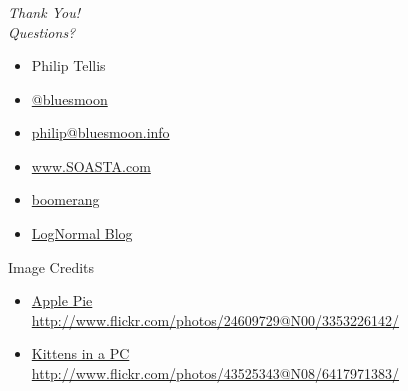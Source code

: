 \documentclass{beamer}
\newcommand{\innersplash}[1]{
  \begin{center}
    \Large \textrm{\textit{ #1 } }
  \end{center}
}
\newcommand{\splashslide}[2][{}]{
  \begin{frame}
  \frametitle{#1}
  \innersplash{#2}
  \end{frame}
}
\begin{document}
\splashslide{Thank You! \\ Questions?}

\begin{frame}
  \begin{itemize}
  \item Philip Tellis
  \item \href{http://twitter.com/bluesmoon}{@bluesmoon}
  \item \href{http://bluesmoon.info/}{philip@bluesmoon.info}
  \item \href{http://www.soasta.com/}{www.SOASTA.com}
  \item \href{http://lognormal.github.com/boomerang/doc/}{boomerang}
  \item \href{http://www.lognormal.com/blog/}{LogNormal Blog}
  \end{itemize}
\end{frame}

\begin{frame}{Image Credits}
\begin{itemize}
  \item \href{http://www.flickr.com/photos/24609729@N00/3353226142/}{Apple Pie  \\ \small http://www.flickr.com/photos/24609729@N00/3353226142/}
  \item \href{http://www.flickr.com/photos/43525343@N08/6417971383/}{Kittens in a PC  \\ \small http://www.flickr.com/photos/43525343@N08/6417971383/}
\end{itemize}
\end{frame}
\end{document}

